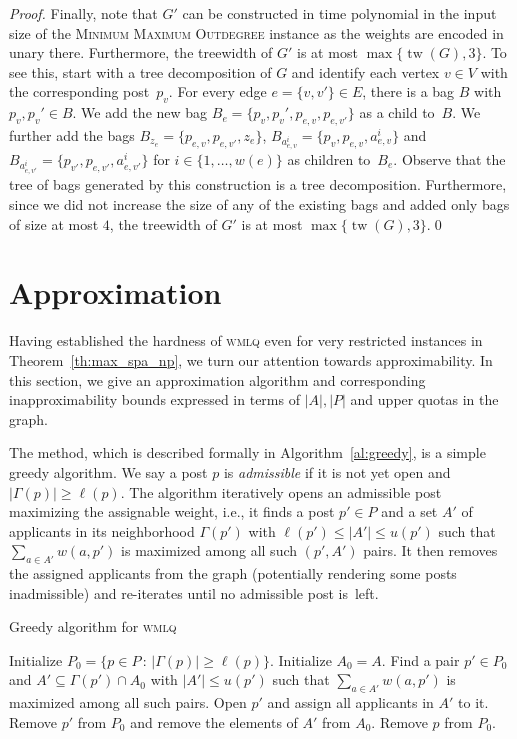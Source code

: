 \documentclass{llncs}
\newcommand{\tw}{\operatorname{tw}}
\begin{document}
\begin{proof}
  Finally, note that $G'$ can be constructed in time polynomial in the input size of the \textsc{Minimum Maximum Outdegree} instance as the weights are encoded in unary there. Furthermore, the treewidth of $G'$ is at most $\max \{\tw(G), 3\}$. To see this, start with a tree decomposition of $G$ and identify each vertex $v \in V$ with the corresponding post~$p_v$. For every edge $e = \{v, v'\} \in E$, there is a bag $B$ with $p_v, p_v' \in B$. We add the new bag $B_e = \{p_v, p_v', p_{e, v}, p_{e, v'}\}$ as a child to~$B$. We further add the bags $B_{z_e} = \{p_{e, v}, p_{e, v'}, z_e\}$, $B_{a^i_{e,v}} = \{p_v, p_{e, v}, a^i_{e,v}\}$ and $B_{a^i_{e,v'}} = \{p_{v'}, p_{e, v'}, a^i_{e,v'}\}$ for $i \in \{1, \dots, w(e)\}$ as children to~$B_e$. Observe that the tree of bags generated by this construction is a tree decomposition. Furthermore, since we did not increase the size of any of the existing bags and added only bags of size at most $4$, the treewidth of $G'$ is at most $\max \{\tw(G), 3\}$.\qed
\end{proof}

\section{Approximation}
\label{se:approx}
Having established the hardness of \textsc{wmlq} even for very restricted instances in Theorem~\ref{th:max_spa_np}, we turn our attention towards approximability. In this section, we give an approximation algorithm and corresponding inapproximability bounds expressed in terms of $|A|, |P|$ and upper quotas in the graph.

The method, which is described formally in Algorithm~\ref{al:greedy}, is a simple greedy algorithm. We say a post $p$ is \emph{admissible} if it is not yet open and $|\Gamma(p)| \geq \ell(p)$. The algorithm iteratively opens an admissible post maximizing the assignable weight, i.e., it finds a post $p' \in P$ and a set $A'$ of applicants in its neighborhood $\Gamma(p')$ with $\ell(p') \leq |A'| \leq u(p')$ such that $\sum_{a \in A'} w(a, p')$ is maximized among all such $(p', A')$ pairs. It then removes the assigned applicants from the graph (potentially rendering some posts inadmissible) and re-iterates until no admissible post is~left.

\begin{algorithm}[h]
\caption{Greedy algorithm for \textsc{wmlq}}
\label{al:greedy}
\begin{algorithmic}
\State Initialize $P_0 = \{p \in P \,:\, |\Gamma(p)| \geq \ell(p)\}$.
\State Initialize $A_0 = A$.
    \State Find a pair $p' \in P_0$ and $A' \subseteq \Gamma(p') \cap A_0$ with $|A'| \leq u(p')$ such that $\sum_{a \in A'} w(a, p')$ is maximized among all such pairs. 
    \State Open $p'$ and assign all applicants in $A'$ to it.
    \State Remove $p'$ from $P_0$ and remove the elements of $A'$ from $A_0$.
    	\State Remove $p$ from $P_0$.
    \EndFor
\EndWhile
\end{algorithmic}
\end{algorithm}
\end{document}
